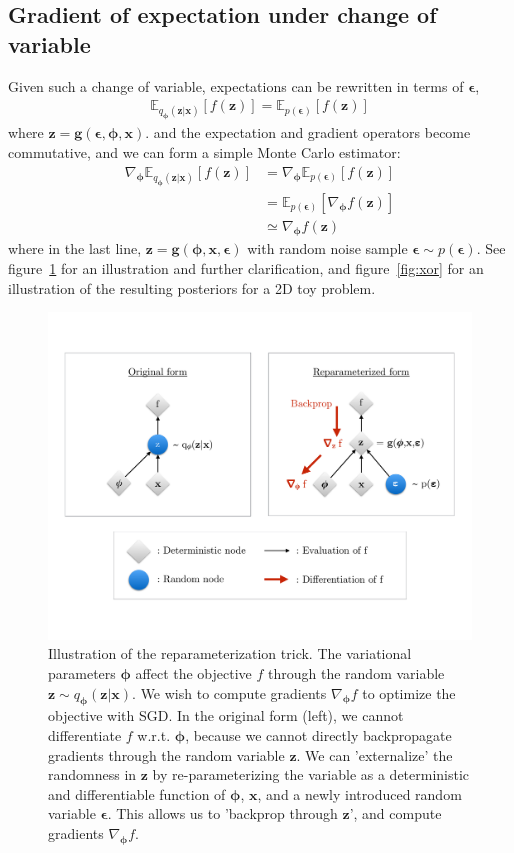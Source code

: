 \documentclass[MAL,biber]{nowfnt} %
\newcommand{\bb}[1]{\mathbf{#1}}
\newcommand{\bx}{\bb{x}}
\newcommand{\bg}{\bb{g}}
\newcommand{\bz}{\bb{z}}
\newcommand{\bphi}{\boldsymbol{\phi}}
\newcommand{\beps}{\boldsymbol{\epsilon}}
\newcommand{\qP}{q_{\bphi}}
\newcommand{\Exp}[2]{\mathbb{E}_{#1}\left[#2\right]}
\begin{document}
\subsection{Gradient of expectation under change of variable}
Given such a change of variable, expectations can be rewritten in terms of $
\beps$, 
\begin{align}
\Exp{\qP(\bz|\bx)}{f(\bz)} = \Exp{p(\beps)}{f(\bz)}
\end{align}
where $\bz = \bg(\beps,\bphi,\bx)$.
and the expectation and gradient operators become commutative, and we can form a simple Monte Carlo estimator:
\begin{align}
\nabla_{\bphi} \Exp{\qP(\bz|\bx)}{f(\bz)} 
&= \nabla_{\bphi} \Exp{p(\beps)}{f(\bz)} \\
&=  \Exp{p(\beps)}{\nabla_{\bphi} f(\bz)}\\
&\simeq \nabla_{\bphi} f(\bz)
\end{align}
where in the last line, $\bz = \bg(\bphi,\bx,\beps)$ with random noise sample $\beps \sim p(\beps)$.
See figure~\ref{fig:reparameterization} for an illustration and further clarification, and figure~\ref{fig:xor} for an illustration of the resulting posteriors for a 2D toy problem.

\begin{figure}
	\centering
	\includegraphics[width=0.9\linewidth]{figures/reparameterization}
	\caption{Illustration of the reparameterization trick. The variational parameters $\bphi$ affect the objective $f$ through the random variable $\bz \sim \qP(\bz|\bx)$. We wish to compute gradients $\nabla_{\bphi} f$ to optimize the objective with SGD. In the original form (left), we cannot differentiate $f$ w.r.t. $\bphi$, because we cannot directly backpropagate gradients through the random variable $\bz$. We can 'externalize' the randomness in $\bz$ by re-parameterizing the variable as a deterministic and differentiable function of $\bphi$, $\bx$, and a newly introduced random variable $\beps$. This allows us to 'backprop through $\bz$', and compute gradients $\nabla_{\bphi} f$.}
	\label{fig:reparameterization}
\end{figure}
\end{document}
